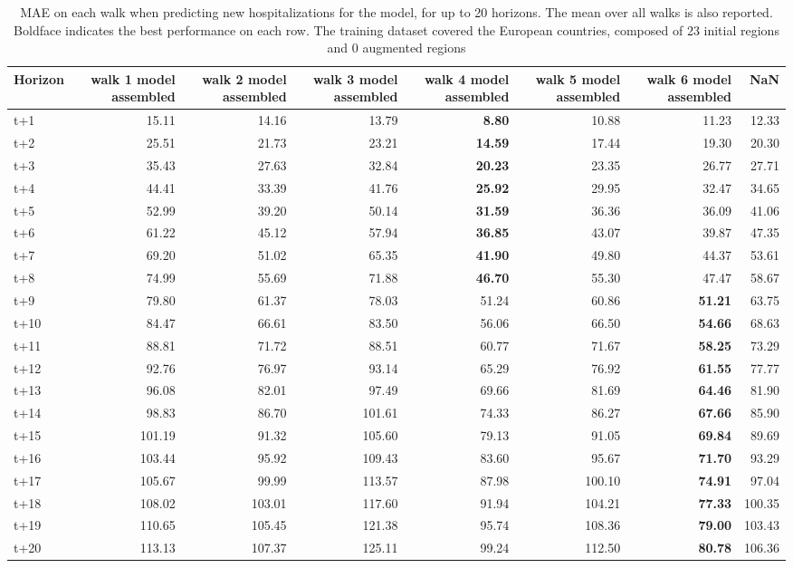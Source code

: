 \begin{table}[H]
\centering
\caption{MAE on each walk when predicting new hospitalizations for the model, for up to 20 horizons. The mean over all walks is also reported. Boldface indicates the best performance on each row. The training dataset covered the European countries, composed of 23 initial regions and 0 augmented regions }
\label{tab:MAE_walk_assembly}
\begin{tabular}{lrrrrrrr}
\toprule
Horizon &  walk 1 model assembled &  walk 2 model assembled &  walk 3 model assembled &  walk 4 model assembled &  walk 5 model assembled &  walk 6 model assembled &    NaN \\
\midrule
t+1  & 15.11  & 14.16  & 13.79  & \textbf{8.80}  & 10.88  & 11.23  & 12.33  \\
t+2  & 25.51  & 21.73  & 23.21  & \textbf{14.59}  & 17.44  & 19.30  & 20.30  \\
t+3  & 35.43  & 27.63  & 32.84  & \textbf{20.23}  & 23.35  & 26.77  & 27.71  \\
t+4  & 44.41  & 33.39  & 41.76  & \textbf{25.92}  & 29.95  & 32.47  & 34.65  \\
t+5  & 52.99  & 39.20  & 50.14  & \textbf{31.59}  & 36.36  & 36.09  & 41.06  \\
t+6  & 61.22  & 45.12  & 57.94  & \textbf{36.85}  & 43.07  & 39.87  & 47.35  \\
t+7  & 69.20  & 51.02  & 65.35  & \textbf{41.90}  & 49.80  & 44.37  & 53.61  \\
t+8  & 74.99  & 55.69  & 71.88  & \textbf{46.70}  & 55.30  & 47.47  & 58.67  \\
t+9  & 79.80  & 61.37  & 78.03  & 51.24  & 60.86  & \textbf{51.21}  & 63.75  \\
t+10  & 84.47  & 66.61  & 83.50  & 56.06  & 66.50  & \textbf{54.66}  & 68.63  \\
t+11  & 88.81  & 71.72  & 88.51  & 60.77  & 71.67  & \textbf{58.25}  & 73.29  \\
t+12  & 92.76  & 76.97  & 93.14  & 65.29  & 76.92  & \textbf{61.55}  & 77.77  \\
t+13  & 96.08  & 82.01  & 97.49  & 69.66  & 81.69  & \textbf{64.46}  & 81.90  \\
t+14  & 98.83  & 86.70  & 101.61  & 74.33  & 86.27  & \textbf{67.66}  & 85.90  \\
t+15  & 101.19  & 91.32  & 105.60  & 79.13  & 91.05  & \textbf{69.84}  & 89.69  \\
t+16  & 103.44  & 95.92  & 109.43  & 83.60  & 95.67  & \textbf{71.70}  & 93.29  \\
t+17  & 105.67  & 99.99  & 113.57  & 87.98  & 100.10  & \textbf{74.91}  & 97.04  \\
t+18  & 108.02  & 103.01  & 117.60  & 91.94  & 104.21  & \textbf{77.33}  & 100.35  \\
t+19  & 110.65  & 105.45  & 121.38  & 95.74  & 108.36  & \textbf{79.00}  & 103.43  \\
t+20  & 113.13  & 107.37  & 125.11  & 99.24  & 112.50  & \textbf{80.78}  & 106.36  \\

\bottomrule
\end{tabular}
\end{table}
